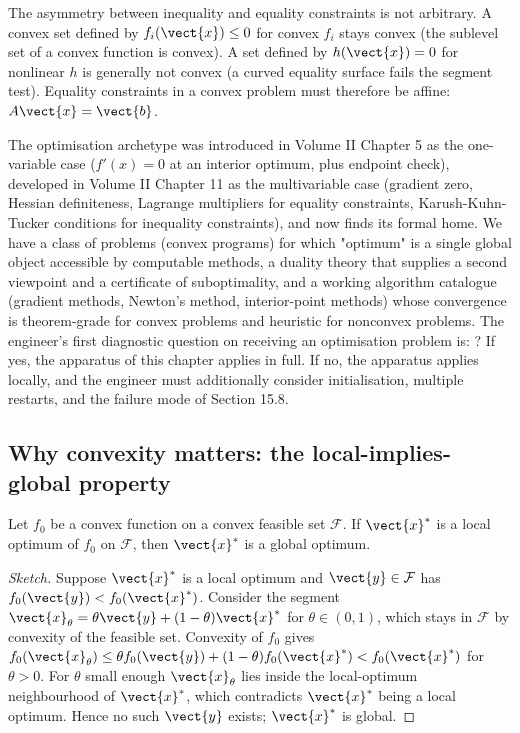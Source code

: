The asymmetry between inequality and equality constraints is not
arbitrary. A convex set defined by $f_{i}(\vect{x}) \leq 0$ for
convex $f_{i}$ stays convex (the sublevel set of a convex function
is convex). A set defined by $h(\vect{x}) = 0$ for nonlinear $h$
is generally not convex (a curved equality surface fails the
segment test). Equality constraints in a convex problem must
therefore be affine: $A \vect{x} = \vect{b}$.

\begin{archetype}
The optimisation archetype was introduced in Volume II Chapter 5
as the one-variable case ($f'(x) = 0$ at an interior optimum,
plus endpoint check), developed in Volume II Chapter 11 as the
multivariable case (gradient zero, Hessian definiteness, Lagrange
multipliers for equality constraints, Karush-Kuhn-Tucker
conditions for inequality constraints), and now finds its formal
home. We have a class of problems (convex programs) for which
"optimum" is a single global object accessible by computable
methods, a duality theory that supplies a second viewpoint and a
certificate of suboptimality, and a working algorithm catalogue
(gradient methods, Newton's method, interior-point methods)
whose convergence is theorem-grade for convex problems and
heuristic for nonconvex problems. The engineer's first
diagnostic question on receiving an optimisation problem is:
? If yes, the apparatus of this chapter
applies in full. If no, the apparatus applies locally, and the
engineer must additionally consider initialisation, multiple
restarts, and the failure mode of Section 15.8.
\end{archetype}

\subsection{Why convexity matters: the local-implies-global property}

\begin{theorem}
Let $f_{0}$ be a convex function on a convex feasible set
$\mathcal{F}$. If $\vect{x}^{*}$ is a local optimum of $f_{0}$ on
$\mathcal{F}$, then $\vect{x}^{*}$ is a global optimum.
\end{theorem}

\begin{proof}[Sketch]
Suppose $\vect{x}^{*}$ is a local optimum and $\vect{y} \in
\mathcal{F}$ has $f_{0}(\vect{y}) < f_{0}(\vect{x}^{*})$. Consider
the segment $\vect{x}_{\theta} = \theta \vect{y} + (1 - \theta)
\vect{x}^{*}$ for $\theta \in (0, 1)$, which stays in
$\mathcal{F}$ by convexity of the feasible set. Convexity of
$f_{0}$ gives $f_{0}(\vect{x}_{\theta}) \leq \theta f_{0}(\vect{y})
+ (1 - \theta) f_{0}(\vect{x}^{*}) < f_{0}(\vect{x}^{*})$ for
$\theta > 0$. For $\theta$ small enough $\vect{x}_{\theta}$ lies
inside the local-optimum neighbourhood of $\vect{x}^{*}$, which
contradicts $\vect{x}^{*}$ being a local optimum. Hence no such
$\vect{y}$ exists; $\vect{x}^{*}$ is global.
\end{proof}


